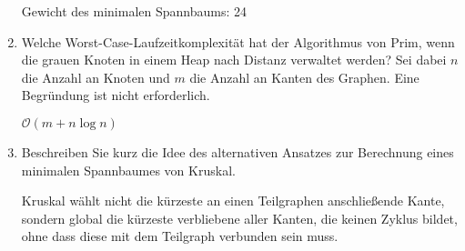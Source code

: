 \documentclass{bschlangaul-aufgabe}
\begin{document}
\begin{enumerate}
\begin{bAntwort}
\bigskip

Gewicht des minimalen Spannbaums: 24


\begin{center}
\end{center}
\end{bAntwort}


\item Welche Worst-Case-Laufzeitkomplexität hat der Algorithmus von
Prim, wenn die grauen Knoten in einem Heap nach Distanz verwaltet
werden? Sei dabei $n$ die Anzahl an Knoten und $m$ die Anzahl an Kanten
des Graphen. Eine Begründung ist nicht erforderlich.

\begin{bAntwort}
$\mathcal{O}(m + n \log n)$
\end{bAntwort}


\item Beschreiben Sie kurz die Idee des alternativen Ansatzes zur
Berechnung eines minimalen Spannbaumes von Kruskal.

\begin{bAntwort}
Kruskal wählt nicht die kürzeste an einen Teilgraphen anschließende
Kante, sondern global die kürzeste verbliebene aller Kanten, die keinen
Zyklus bildet, ohne dass diese mit dem Teilgraph verbunden sein muss.
\end{bAntwort}

\end{enumerate}
\end{document}
